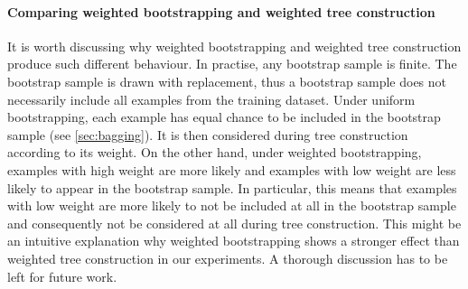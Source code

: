 \documentclass[../main.tex]{subfiles}
\begin{document}
\paragraph{Comparing weighted bootstrapping and weighted tree construction} It is worth discussing why weighted bootstrapping and weighted tree construction produce such different behaviour. 
%
%
In practise, any bootstrap sample is finite. The bootstrap sample is drawn with replacement, thus a bootstrap sample does not necessarily include all examples from the training dataset. 
%
Under uniform bootstrapping, each example has equal chance to be included in the bootstrap sample (see \ref{sec:bagging}). It is then considered during tree construction according to its weight. On the other hand, under weighted bootstrapping, examples with high weight are more likely and examples with low weight are less likely to appear in the bootstrap sample. In particular, this means that examples with low weight are more likely to not be included at all in the bootstrap sample and consequently not be considered at all during tree construction. 
%
This might be an intuitive explanation why weighted bootstrapping shows a stronger effect than weighted tree construction in our experiments.  A thorough discussion has to be left for future work. 
\end{document}
